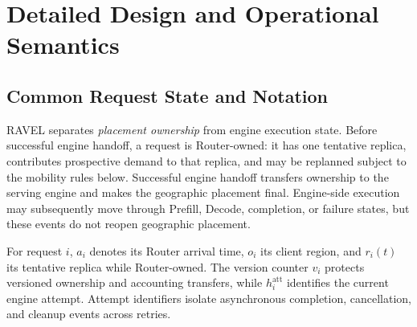 \documentclass[letterpaper,twocolumn,10pt]{article}
\begin{document}
{\footnotesize


}

\clearpage
\appendix

\newcommand{\AppendixPlan}[3]{%
\paragraph{Question addressed.}
#1

\paragraph{Content to include.}
#2

\paragraph{Required evidence.}
#3
}


\section{Detailed Design and Operational Semantics}
\label{app:design-details}


\subsection{Common Request State and Notation}
\label{sec:appendix:state-model}

RAVEL separates \emph{placement ownership} from engine execution state.
Before successful engine handoff, a request is Router-owned: it has one
tentative replica, contributes prospective demand to that replica, and may be
replanned subject to the mobility rules below.
Successful engine handoff transfers ownership to the serving engine and makes
the geographic placement final.
Engine-side execution may subsequently move through Prefill, Decode,
completion, or failure states, but these events do not reopen geographic
placement.

For request $i$, $a_i$ denotes its Router arrival time, $o_i$ its client
region, and $r_i(t)$ its tentative replica while Router-owned.
The version counter $v_i$ protects versioned ownership and accounting
transfers, while $h_i^{\mathrm{att}}$ identifies the current engine attempt.
Attempt identifiers isolate asynchronous completion, cancellation, and cleanup
events across retries.
\end{document}
